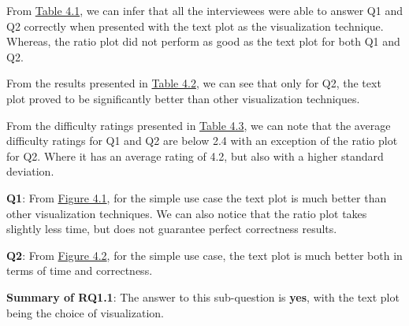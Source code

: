\begin{description}[leftmargin=0pt]
\item[Correctness: ]From \hyperref[table:correctness]{Table 4.1}, we can infer that all the interviewees were able to answer Q1 and Q2 correctly when presented with the text plot as the visualization technique. Whereas, the ratio plot did not perform as good as the text plot for both Q1 and Q2.

\item[Time Measurements: ]From the results presented in \hyperref[table:time]{Table 4.2}, we can see that only for Q2, the text plot proved to be significantly better than other visualization techniques.

\item[Difficulty Ratings: ]From the difficulty ratings presented in \hyperref[table:rating]{Table 4.3}, we can note that the average difficulty ratings for Q1 and Q2 are below 2.4 with an exception of the ratio plot for Q2. Where it has an average rating of 4.2, but also with a higher standard deviation.

\end{description}

\textbf{Q1}: From \hyperref[figure:paretoOneQ1]{Figure 4.1}, for the simple use case the text plot is much better than other visualization techniques. We can also notice that the ratio plot takes slightly less time, but does not guarantee perfect correctness results.

\textbf{Q2}: From \hyperref[figure:paretoOneQ2]{Figure 4.2}, for the simple use case, the text plot is much better both in terms of time and correctness. 

\textbf{Summary of RQ1.1}: The answer to this sub-question is \textbf{yes}, with the text plot being the choice of visualization.

